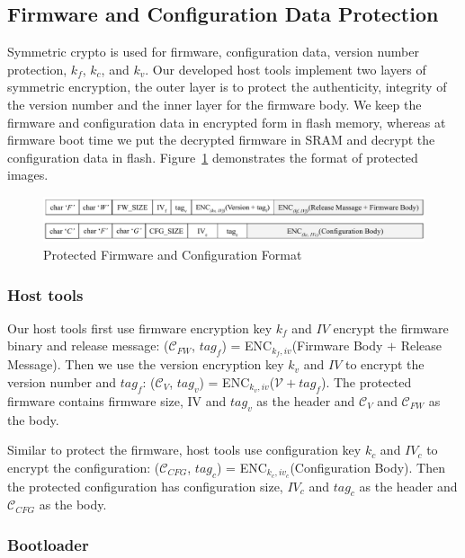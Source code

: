 \documentclass[11pt,oneside,onecolumn,letterpaper]{article}
\begin{document}
\subsection{Firmware and Configuration Data Protection}
Symmetric crypto is used for firmware, configuration data, version number protection, $k_f$, $k_c$, and $k_v$.
Our developed host tools implement two layers of symmetric encryption, the outer layer is to protect the authenticity, integrity of the version number and the inner layer for the firmware body.
We keep the firmware and configuration data in encrypted form in flash memory, whereas at firmware boot time we put the decrypted firmware in SRAM and decrypt the configuration data in flash.
Figure~\ref{fig:frmt} demonstrates the format of protected images.

\begin{figure}[!htbp]
	\begin{centering}
		\includegraphics[width = .98\textwidth]{pic/FW_CFG_FORMAT.pdf}
		\caption{Protected Firmware and Configuration Format}
		\label{fig:frmt}
	\end{centering}
\end{figure}

\subsubsection{Host tools}
Our host tools first use firmware encryption key $k_f$ and $IV$ encrypt the firmware binary and release message: ($\mathcal{C}_{FW}$, $tag_f$) = ENC$_{k_f, iv}$(Firmware Body $+$ Release Message).
Then we use the version encryption key $k_v$ and $IV$ to encrypt the version number and $tag_f$: ($\mathcal{C}_V$, $tag_v$) = ENC$_{k_v, iv}$($\mathcal{V} + tag_f$).
The protected firmware contains firmware size, IV and $tag_v$ as the header and $\mathcal{C}_V$ and $\mathcal{C}_{FW}$ as the body.

Similar to protect the firmware, host tools use configuration key $k_c$ and $IV_c$ to encrypt the configuration: ($\mathcal{C}_{CFG}$, $tag_c$) = ENC$_{k_c, iv_c}$(Configuration Body).
Then the protected configuration has configuration size, $IV_c$ and $tag_c$ as the header and $\mathcal{C}_{CFG}$ as the body.

\subsubsection{Bootloader}
\end{document}
